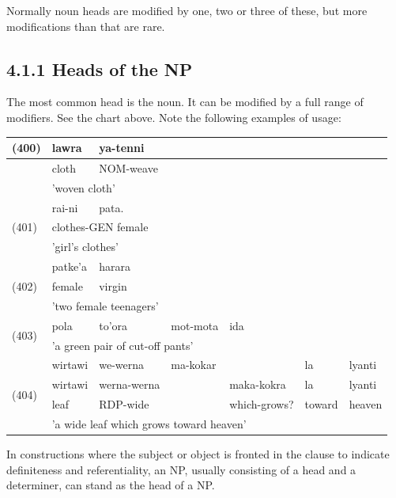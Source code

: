 \documentclass[10pt]{article}
\begin{document}
Normally noun heads are modified by one, two or three of these, but more modifications than that are rare.

\subsection*{4.1.1 Heads of the NP}
The most common head is the noun. It can be modified by a full range of modifiers. See the chart above. Note the following examples of usage:

\begin{center}
\begin{tabular}{|l|l|l|l|l|l|l|}
\hline
\multirow[t]{3}{*}{(400)} & lawra & ya-tenni &  &  & \multirow{6}{*}{} & \multirow{6}{*}{} \\
\hline
 & cloth & NOM-weave &  &  &  &  \\
\hline
 & \multicolumn{4}{|l|}{'woven cloth'} &  &  \\
\hline
\multirow[t]{3}{*}{(401)} & rai-ni & pata. &  &  &  &  \\
\hline
 & \multicolumn{4}{|l|}{clothes-GEN female} &  &  \\
\hline
 & \multicolumn{4}{|l|}{'girl's clothes'} &  &  \\
\hline
\multirow[t]{3}{*}{(402)} & patke'a & harara &  &  &  &  \\
\hline
 & female & virgin &  &  &  &  \\
\hline
 & \multicolumn{4}{|l|}{'two female teenagers'} &  &  \\
\hline
\multirow[t]{2}{*}{(403)} & pola & to'ora & mot-mota & ida &  &  \\
\hline
 & \multicolumn{5}{|l|}{'a green pair of cut-off pants'} &  \\
\hline
\multirow[t]{4}{*}{(404)} & wirtawi & we-werna & ma-kokar &  & la & lyanti \\
\hline
 & wirtawi & werna-werna &  & maka-kokra & la & lyanti \\
\hline
 & leaf & RDP-wide &  & which-grows? & toward & heaven \\
\hline
 & \multicolumn{6}{|l|}{'a wide leaf which grows toward heaven'} \\
\hline
\end{tabular}
\end{center}

In constructions where the subject or object is fronted in the clause to indicate definiteness and referentiality, an NP, usually consisting of a head and a determiner, can stand as the head of a NP.
\end{document}
